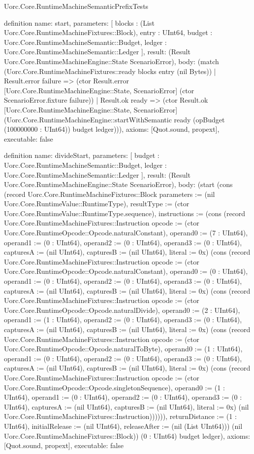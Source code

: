 \begin{lexlean}{Uorc.Core.RuntimeMachineSemanticPrefixTests}
\begin{semanticmodule}
definition{
  name: start,
  parameters: [
    blocks : (List Uorc.Core.RuntimeMachineFixtures::Block),
    entry : UInt64,
    budget : Uorc.Core.RuntimeMachineSemantic::Budget,
    ledger : Uorc.Core.RuntimeMachineSemantic::Ledger
  ],
  result: (Result Uorc.Core.RuntimeMachineEngine::State ScenarioError),
  body: (match (Uorc.Core.RuntimeMachineFixtures::ready blocks entry (nil Bytes))
    | Result.error failure => (ctor Result.error [Uorc.Core.RuntimeMachineEngine::State, ScenarioError] (ctor ScenarioError.fixture failure))
    | Result.ok ready => (ctor Result.ok [Uorc.Core.RuntimeMachineEngine::State, ScenarioError] (Uorc.Core.RuntimeMachineEngine::startWithSemantic ready (opBudget (100000000 : UInt64)) budget ledger))),
  axioms: [Quot.sound, propext],
  executable: false
}

definition{
  name: divideStart,
  parameters: [
    budget : Uorc.Core.RuntimeMachineSemantic::Budget,
    ledger : Uorc.Core.RuntimeMachineSemantic::Ledger
  ],
  result: (Result Uorc.Core.RuntimeMachineEngine::State ScenarioError),
  body: (start (cons (record Uorc.Core.RuntimeMachineFixtures::Block {parameters := (nil Uorc.Core.RuntimeValue::RuntimeType), resultType := (ctor Uorc.Core.RuntimeValue::RuntimeType.sequence), instructions := (cons (record Uorc.Core.RuntimeMachineFixtures::Instruction {opcode := (ctor Uorc.Core.RuntimeOpcode::Opcode.naturalConstant), operand0 := (7 : UInt64), operand1 := (0 : UInt64), operand2 := (0 : UInt64), operand3 := (0 : UInt64), capturesA := (nil UInt64), capturesB := (nil UInt64), literal := 0x}) (cons (record Uorc.Core.RuntimeMachineFixtures::Instruction {opcode := (ctor Uorc.Core.RuntimeOpcode::Opcode.naturalConstant), operand0 := (0 : UInt64), operand1 := (0 : UInt64), operand2 := (0 : UInt64), operand3 := (0 : UInt64), capturesA := (nil UInt64), capturesB := (nil UInt64), literal := 0x}) (cons (record Uorc.Core.RuntimeMachineFixtures::Instruction {opcode := (ctor Uorc.Core.RuntimeOpcode::Opcode.naturalDivide), operand0 := (2 : UInt64), operand1 := (1 : UInt64), operand2 := (0 : UInt64), operand3 := (0 : UInt64), capturesA := (nil UInt64), capturesB := (nil UInt64), literal := 0x}) (cons (record Uorc.Core.RuntimeMachineFixtures::Instruction {opcode := (ctor Uorc.Core.RuntimeOpcode::Opcode.naturalToByte), operand0 := (1 : UInt64), operand1 := (0 : UInt64), operand2 := (0 : UInt64), operand3 := (0 : UInt64), capturesA := (nil UInt64), capturesB := (nil UInt64), literal := 0x}) (cons (record Uorc.Core.RuntimeMachineFixtures::Instruction {opcode := (ctor Uorc.Core.RuntimeOpcode::Opcode.singletonSequence), operand0 := (1 : UInt64), operand1 := (0 : UInt64), operand2 := (0 : UInt64), operand3 := (0 : UInt64), capturesA := (nil UInt64), capturesB := (nil UInt64), literal := 0x}) (nil Uorc.Core.RuntimeMachineFixtures::Instruction)))))), returnDistance := (1 : UInt64), initialRelease := (nil UInt64), releaseAfter := (nil (List UInt64))}) (nil Uorc.Core.RuntimeMachineFixtures::Block)) (0 : UInt64) budget ledger),
  axioms: [Quot.sound, propext],
  executable: false
}


\end{semanticmodule}
\end{lexlean}
